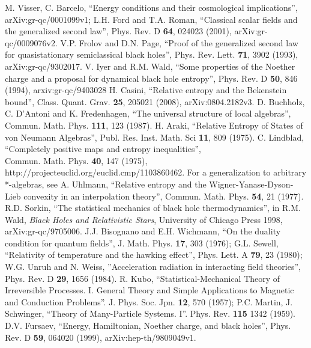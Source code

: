 \documentclass[12pt]{article}
\begin{document}
\begin{thebibliography}{99}
M. Visser, C. Barcelo, ``Energy conditions and their cosmological implications'', 	arXiv:gr-qc/0001099v1; L.H. Ford and T.A. Roman, ``Classical scalar fields and the generalized second law'', Phys. Rev. D \textbf{64}, 024023 (2001), arXiv:gr-qc/0009076v2.
V.P. Frolov and D.N. Page, ``Proof of the generalized second law for quasistationary semiclassical black holes'', Phys. Rev. Lett. \textbf{71}, 3902 (1993), arXiv:gr-qc/9302017.
V. Iyer and R.M. Wald, ``Some properties of the Noether charge and a proposal for dynamical black hole entropy'', Phys. Rev. D \textbf{50}, 846 (1994), arxiv:gr-qc/9403028
H. Casini, ``Relative entropy and the Bekenstein bound'', Class. Quant. Grav. \textbf{25}, 205021 (2008), arXiv:0804.2182v3.
D. Buchholz, C. D'Antoni and K. Fredenhagen, ``The universal structure of local algebras'', Commun. Math. Phys. \textbf{111}, 123 (1987).
H. Araki, ``Relative Entropy of States of von Neumann Algebras'', Publ. Res. Inst. Math. Sci \textbf{11}, 809 (1975).
C. Lindblad, ``Completely positive maps and entropy inequalities'', \\Commun. Math. Phys. \textbf{40}, 147 (1975), \\http://projecteuclid.org/euclid.cmp/1103860462.  For a generalization to arbitrary *-algebras, see A. Uhlmann, ``Relative entropy and the Wigner-Yanase-Dyson-Lieb convexity in an interpolation theory'', Commun. Math. Phys. \textbf{54}, 21 (1977).
R.D. Sorkin, ``The statistical mechanics of black hole thermodynamics'', in R.M. Wald, \textit{Black Holes and Relativistic Stars}, University of Chicago Press 1998, arXiv:gr-qc/9705006.
J.J. Bisognano and E.H. Wichmann, ``On the duality condition for quantum fields'', J. Math. Phys. \textbf{17}, 303 (1976); G.L. Sewell, ``Relativity of temperature and the hawking effect'', Phys. Lett. A \textbf{79}, 23 (1980); W.G. Unruh and N. Weiss, ''Acceleration radiation in interacting field theories'', Phys. Rev. D \textbf{29}, 1656 (1984).  
R. Kubo, ``Statistical-Mechanical Theory of Irreversible Processes. I. General Theory and Simple Applications to Magnetic and Conduction Problems''. J. Phys. Soc. Jpn. \textbf{12}, 570 (1957); P.C. Martin, J. Schwinger,  ``Theory of Many-Particle Systems. I''. Phys. Rev. \textbf{115} 1342 (1959).
D.V. Fursaev, ``Energy, Hamiltonian, Noether charge, and black holes'', Phys. Rev. D \textbf{59}, 064020 (1999), arXiv:hep-th/9809049v1.

\end{thebibliography}
\end{document}
